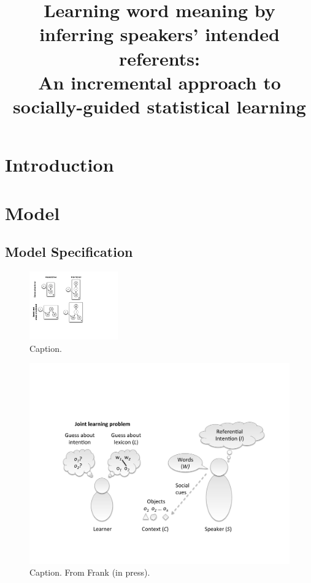 \documentclass[man,noapacite]{apa2}
\title{Learning word meaning by inferring speakers' intended referents: \\ An incremental approach to socially-guided statistical learning}
\begin{document}
\maketitle                            


\section{Introduction}


\section{Model}

\subsection{Model Specification}
\begin{figure}[tr]
\begin{center}
\includegraphics[width=1.5in]{figures/gen_mod.pdf}
\caption{\label{fig:genmod} Caption.}
\end{center}
\end{figure}

\begin{figure}[tr]
\begin{center}
\includegraphics[width=4.5in]{figures/setup.pdf}
\caption{\label{fig:setup} Caption. From Frank (in press). }
\end{center}
\end{figure}
\end{document}
